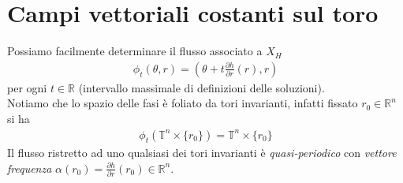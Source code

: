 \documentclass[twoside, 11pt]{amsbook}
\newcommand{\0}{{(0)}}
\newcommand{\3}{{(3)}}
\theoremstyle{colonplain}
\theoremstyle{colondefinition}
\theoremstyle{colonremark}
\numberwithin{equation}{chapter}
\begin{document}
\section{Campi vettoriali costanti sul toro}
Possiamo facilmente determinare il flusso associato a $X_H$ 
\begin{align}
    \phi_t(\theta, r) = \left(\theta + t\frac{\partial h}{\partial r}(r), r\right) 
\end{align}
per ogni $t \in \mathbb{R}$ (intervallo massimale di definizioni delle soluzioni). \\
Notiamo che lo spazio delle fasi è foliato da tori invarianti, infatti fissato $r_0 \in \mathbb{R}^n$ si ha 
\begin{align}
    \phi_t\left(\mathbb{T}^n \times \{r_0\}\right) = \mathbb{T}^n \times \{r_0\} 
\end{align}
Il flusso ristretto ad uno qualsiasi dei tori invarianti è \textit{quasi-periodico} con \textit{vettore frequenza} $\alpha(r_0) = \frac{\partial h}{\partial r}(r_0) \in \mathbb{R}^n$.
\end{document}
